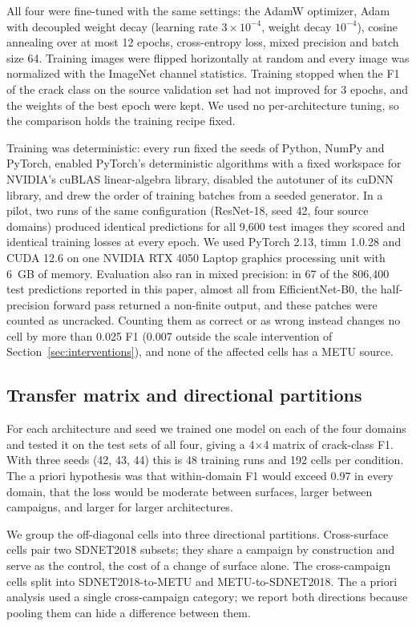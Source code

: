 \documentclass[pdflatex,sn-apa]{sn-jnl}
\begin{document}
All four were fine-tuned with the same settings: the AdamW optimizer, Adam with decoupled weight decay \citep{loshchilov2019} (learning rate $3\times10^{-4}$, weight decay $10^{-4}$), cosine annealing over at most 12 epochs, cross-entropy loss, mixed precision and batch size 64. Training images were flipped horizontally at random and every image was normalized with the ImageNet channel statistics. Training stopped when the F1 of the crack class on the source validation set had not improved for 3 epochs, and the weights of the best epoch were kept. We used no per-architecture tuning, so the comparison holds the training recipe fixed.

Training was deterministic: every run fixed the seeds of Python, NumPy and PyTorch, enabled PyTorch's deterministic algorithms with a fixed workspace for NVIDIA's cuBLAS linear-algebra library, disabled the autotuner of its cuDNN library, and drew the order of training batches from a seeded generator. In a pilot, two runs of the same configuration (ResNet-18, seed 42, four source domains) produced identical predictions for all 9,600 test images they scored and identical training losses at every epoch. We used PyTorch 2.13, timm 1.0.28 and CUDA 12.6 on one NVIDIA RTX 4050 Laptop graphics processing unit with 6~GB of memory. Evaluation also ran in mixed precision: in 67 of the 806,400 test predictions reported in this paper, almost all from EfficientNet-B0, the half-precision forward pass returned a non-finite output, and these patches were counted as uncracked. Counting them as correct or as wrong instead changes no cell by more than 0.025 F1 (0.007 outside the scale intervention of Section~\ref{sec:interventions}), and none of the affected cells has a METU source.

\subsection{Transfer matrix and directional partitions}\label{sec:matrix}

For each architecture and seed we trained one model on each of the four domains and tested it on the test sets of all four, giving a 4$\times$4 matrix of crack-class F1. With three seeds (42, 43, 44) this is 48 training runs and 192 cells per condition. The a priori hypothesis was that within-domain F1 would exceed 0.97 in every domain, that the loss would be moderate between surfaces, larger between campaigns, and larger for larger architectures.

We group the off-diagonal cells into three directional partitions. Cross-surface cells pair two SDNET2018 subsets; they share a campaign by construction and serve as the control, the cost of a change of surface alone. The cross-campaign cells split into SDNET2018-to-METU and METU-to-SDNET2018. The a priori analysis used a single cross-campaign category; we report both directions because pooling them can hide a difference between them.
\end{document}
